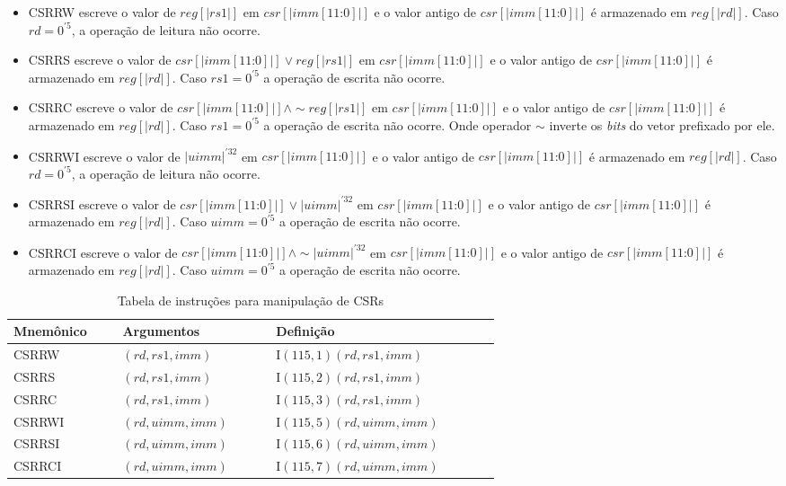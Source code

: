   \begin{itemize}
    \item CSRRW escreve o valor de $reg[|rs1|]$ em $csr[|imm[11\text{:}0]|]$ e o valor antigo de $csr[|imm[11\text{:}0]|]$
          é armazenado em $reg[|rd|]$. Caso $rd = 0^{'5}$, a operação de leitura não ocorre.
    \item CSRRS escreve o valor de $csr[|imm[11\text{:}0]|] \lor reg[|rs1|]$ em $csr[|imm[11\text{:}0]|]$ e o valor antigo 
          de $csr[|imm[11\text{:}0]|]$ é armazenado em $reg[|rd|]$.
          Caso $rs1 = 0^{'5}$ a operação de escrita não ocorre.
    \item CSRRC escreve o valor de $csr[|imm[11\text{:}0]|] \land \sim\! reg[|rs1|]$ em $csr[|imm[11\text{:}0]|]$ e o valor antigo 
          de $csr[|imm[11\text{:}0]|]$ é armazenado em $reg[|rd|]$. 
          Caso $rs1 = 0^{'5}$ a operação de escrita não ocorre. Onde operador $\sim$ inverte os \emph{bits} do vetor prefixado por ele.
    \item CSRRWI escreve o valor de $|uimm|^{'32}$ em $csr[|imm[11\text{:}0]|]$ e o valor antigo de $csr[|imm[11\text{:}0]|]$
          é armazenado em $reg[|rd|]$. Caso $rd = 0^{'5}$, a operação de leitura não ocorre.
    \item CSRRSI escreve o valor de $csr[|imm[11\text{:}0]|] \lor |uimm|^{'32}$ em $csr[|imm[11\text{:}0]|]$ e o valor antigo 
          de $csr[|imm[11\text{:}0]|]$ é armazenado em $reg[|rd|]$. Caso $uimm = 0^{'5}$ a operação de escrita não ocorre.
    \item CSRRCI escreve o valor de $csr[|imm[11\text{:}0]|] \land \sim\! |uimm|^{'32}$ em $csr[|imm[11\text{:}0]|]$ e o valor antigo 
          de $csr[|imm[11\text{:}0]|]$ é armazenado em $reg[|rd|]$. Caso $uimm = 0^{'5}$ a operação de escrita não ocorre.
  \end{itemize} 

  \begin{table}
    \begin{tabular}{ |p{0.13\linewidth}||p{0.2\linewidth}|p{0.3\linewidth}| } 
      \hline
      Mnemônico & Argumentos & Definição\\ \hline \hline

CSRRW & $(rd, rs1, imm)$ & I$(115, 1)(rd, rs1, imm)$ \\ \hline
CSRRS & $(rd, rs1, imm)$ & I$(115, 2)(rd, rs1, imm)$ \\ \hline
CSRRC & $(rd, rs1, imm)$ & I$(115, 3)(rd, rs1, imm)$ \\ \hline
CSRRWI & $(rd, uimm, imm)$ & I$(115, 5)(rd, uimm, imm)$ \\ \hline
CSRRSI & $(rd, uimm, imm)$ & I$(115, 6)(rd, uimm, imm)$ \\ \hline
CSRRCI & $(rd, uimm, imm)$ & I$(115, 7)(rd, uimm, imm)$ \\ \hline

    \end{tabular}
  \caption{Tabela de instruções para manipulação de CSRs \label{tab:csr}}
  \end{table}

